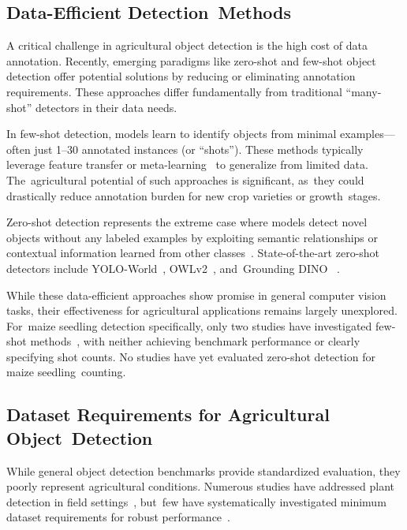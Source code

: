 \documentclass[12pt,a4paper,oneside]{report}
\begin{document}
\subsection{Data-Efficient Detection~Methods}

A critical challenge in agricultural object detection is the high cost of data 
annotation. Recently, emerging paradigms like zero-shot and few-shot object detection
offer potential solutions by reducing or eliminating annotation requirements. These
approaches differ fundamentally from traditional ``many-shot'' detectors in their data
needs.

In few-shot detection, models learn to identify objects from minimal examples—often
just 1--30 annotated instances (or ``shots''). These methods typically leverage feature
transfer or meta-learning~\cite{liMetaSGDLearningLearn2017} to generalize from 
limited data. The~agricultural potential of such approaches is significant, as~they
could drastically reduce annotation burden for new crop varieties or growth~stages.

Zero-shot detection represents the extreme case where models detect novel objects
without any labeled examples by exploiting semantic relationships or contextual
information learned from other classes~\cite{bansalZeroShotObjectDetection2018}.
State-of-the-art zero-shot detectors include YOLO-World~\cite{kangFewshotObjectDetection2019},
OWLv2~\cite{mindererScalingOpenVocabularyObject2023}, and~Grounding DINO
~\cite{liuGroundingDINOMarrying2025}.

While these data-efficient approaches show promise in general computer vision tasks,
their effectiveness for agricultural applications remains largely unexplored. For~maize seedling detection specifically, only two studies have investigated few-shot
methods~\cite{karamiAutomaticPlantCounting2020,wangAdvancingImageRecognition2024},
with neither achieving benchmark performance or clearly specifying shot counts. No
studies have yet evaluated zero-shot detection for maize seedling~counting.

\subsection{Dataset Requirements for Agricultural Object~Detection}

While general object detection benchmarks provide standardized evaluation, they poorly
represent agricultural conditions. Numerous studies have addressed plant detection in
field settings~\cite{barretoAutomaticUAVbasedCounting2021,liuIntegrateNetDeepLearning2022,
kitanoCornPlantCounting2019}, but~few have systematically investigated minimum dataset
requirements for robust performance~\cite{davidPlantDetectionCounting2021,
andvaagCountingCanolaGeneralizable2024}.
\end{document}
